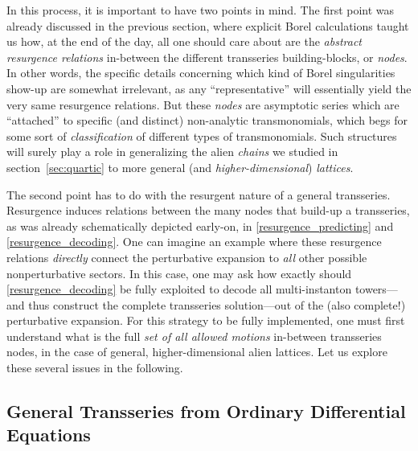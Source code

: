 \documentclass[11pt,a4paper]{article}
\begin{document}
In this process, it is important to have two points in mind. The first point was already discussed in the previous section, where explicit Borel calculations taught us how, at the end of the day, all one should care about are the \textit{abstract resurgence relations} in-between the different transseries building-blocks, or \textit{nodes}. In other words, the specific details concerning which kind of Borel singularities show-up are somewhat irrelevant, as any ``representative'' will essentially yield the very same resurgence relations. But these \textit{nodes} are asymptotic series which are ``attached'' to specific (and distinct) non-analytic transmonomials, which begs for some sort of \textit{classification} of different types of transmonomials. Such structures will surely play a role in generalizing the alien \textit{chains} we studied in section~\ref{sec:quartic} to more general (and \textit{higher-dimensional}) \textit{lattices}.

The second point has to do with the resurgent nature of a general transseries. Resurgence induces relations between the many nodes that build-up a transseries, as was already schematically depicted early-on, in \eqref{resurgence_predicting} and \eqref{resurgence_decoding}. One can imagine an example where these resurgence relations \textit{directly} connect the perturbative expansion to \textit{all} other possible nonperturbative sectors. In this case, one may ask how exactly should \eqref{resurgence_decoding} be fully exploited to decode all multi-instanton towers---and thus construct the complete transseries solution---out of the (also complete!) perturbative expansion. For this strategy to be fully implemented, one must first understand what is the full \textit{set of all allowed motions} in-between transseries nodes, in the case of general, higher-dimensional alien lattices. Let us explore these several issues in the following.

\subsection*{General Transseries from Ordinary Differential Equations}
\end{document}
